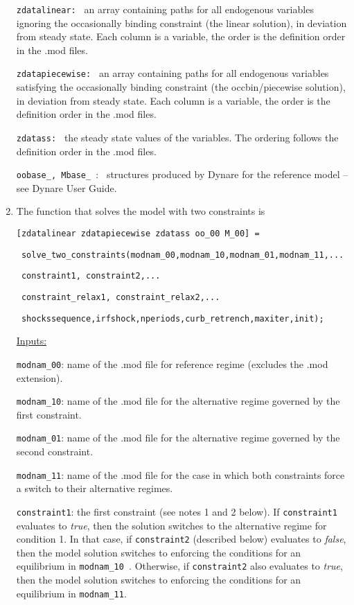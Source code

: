\documentclass[12pt]{article}
\begin{document}
\begin{enumerate}
\texttt{zdatalinear:\ } an array containing paths for all endogenous
variables ignoring the occasionally binding constraint (the linear
solution), in deviation from steady state. Each column is a variable, the
order is the definition order in the .mod files.

\texttt{zdatapiecewise:\ } an array containing paths for all endogenous
variables satisfying the occasionally binding constraint (the
occbin/piecewise solution), in deviation from steady state. Each column is a
variable, the order is the definition order in the .mod files.

\texttt{zdatass:\ } the steady state values of the variables. The ordering
follows the definition order in the .mod files.

\texttt{oobase\_, Mbase\_ }: \ structures produced by Dynare for the
reference model -- see Dynare User Guide.

\medskip \medskip

\item The function that solves the model with two constraints is

\texttt{[zdatalinear zdatapiecewise zdatass oo\_00 M\_00] = }

\texttt{\
solve\_two\_constraints(modnam\_00,modnam\_10,modnam\_01,modnam\_11,...}

\texttt{\ constraint1, constraint2,...}

\texttt{\ constraint\_relax1, constraint\_relax2,...}

\texttt{\ shockssequence,irfshock,nperiods,curb\_retrench,maxiter,init);}

\medskip

\underline{Inputs:}

\texttt{modnam\_00}: name of the .mod file for reference regime (excludes
the .mod extension).

\texttt{modnam\_10}: name of the .mod file for the alternative regime
governed by the first constraint.

\texttt{modnam\_01}: name of the .mod file for the alternative regime
governed by the second constraint.

\texttt{modnam\_11}: name of the .mod file for the case in which both
constraints force a switch to their alternative regimes.

\texttt{constraint1}: the first constraint (see notes 1 and 2 below). If 
\texttt{constraint1} evaluates to \emph{true}, then the solution switches to
the alternative regime for condition 1. In that case, if \texttt{constraint2}
(described below) evaluates to \emph{false}, then the model solution
switches to enforcing the conditions for an equilibrium in \texttt{modnam\_10%
}. Otherwise, if \texttt{constraint2} also evaluates to \emph{true}, then
the model solution switches to enforcing the conditions for an equilibrium
in \texttt{modnam\_11}.


\end{enumerate}
\end{document}
